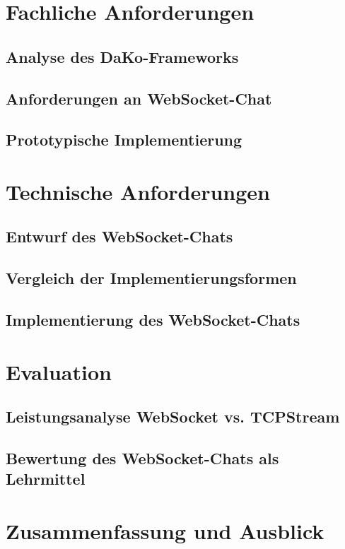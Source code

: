 \documentclass[11pt,a4paper,titlepage]{scrartcl}
\numberwithin{equation}{section}
\begin{document}
\section{Fachliche Anforderungen}
\subsection{Analyse des DaKo-Frameworks}
\subsection{Anforderungen an WebSocket-Chat}
\subsection{Prototypische Implementierung}

\section{Technische Anforderungen}
\subsection{Entwurf des WebSocket-Chats}
\subsection{Vergleich der Implementierungsformen}
\subsection{Implementierung des WebSocket-Chats}

\section{Evaluation}
\subsection{Leistungsanalyse WebSocket vs. TCPStream}
\subsection{Bewertung des WebSocket-Chats als Lehrmittel}

\section{Zusammenfassung und Ausblick}

\newpage

\printbibliography

\end{document}
